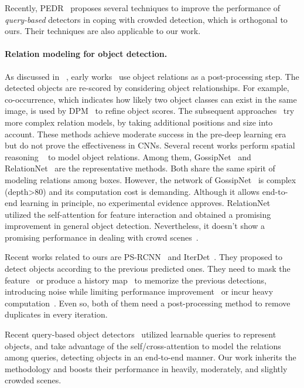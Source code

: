 \documentclass[final]{cvpr}
\begin{document}
Recently, PEDR~\cite{lin2020detr} proposes several techniques to improve the performance of \emph{query-based} detectors in coping with crowded detection, which is orthogonal to ours. Their techniques are also applicable to our work.

\vspace{-0.5cm}
\paragraph{Relation modeling for object detection.}
As discussed in ~\cite{hu2018relation}, early works~\cite{divvala, co-occurrent, torralba, auto-context, in_the_wild} use object relations as a post-processing step. The detected objects are re-scored by considering object relationships. For example, co-occurrence, which indicates how likely two object classes can exist in the same image, is used by DPM~\cite{dpm2010} to refine object scores. The subsequent approaches~\cite{a_role_of_context, tree_based} try more complex relation models, by taking additional positions and size into account. These methods achieve moderate success in the pre-deep learning era but do not prove the effectiveness in CNNs. Several recent works perform spatial reasoning ~\cite{acfobjdetection,end2endlstm,sptial_memory, gossipnet} to model object relations. Among them, GossipNet~\cite{gossipnet} and RelationNet~\cite{hu2018relation} are the representative methods. Both share the same spirit of modeling relations among boxes. However, the network of GossipNet~\cite{gossipnet} is complex (depth\textgreater 80) and its computation cost is demanding. Although it allows end-to-end learning in principle, no experimental evidence approves. RelationNet~\cite{hu2018relation} utilized the self-attention for feature interaction and obtained a promising improvement in general object detection. Nevertheless, it doesn't show a promising performance in dealing with crowd scenes~\cite{shao2018crowdhuman}.


Recent works related to ours are PS-RCNN~\cite{psrcnn} and IterDet~\cite{iterdet2021}. They proposed to detect objects according to the previous predicted ones. They need to mask the feature~\cite{psrcnn} or produce a history map~\cite{iterdet2021} to memorize the previous detections, introducing noise while limiting performance improvement~\cite{psrcnn} or incur heavy computation~\cite{iterdet2021}. Even so, both of them need a post-processing method to remove duplicates in every iteration. 

Recent query-based object detectors~\cite{sun2020sparse, zhu2021deformable, act2021, up2021detr, sun2020tsp, fastCdetr} utilized learnable queries to represent objects, and take advantage of the self/cross-attention to model the relations among queries, detecting objects in an end-to-end manner.  Our work inherits the methodology and boosts their performance in heavily, moderately, and slightly crowded scenes.
\end{document}
